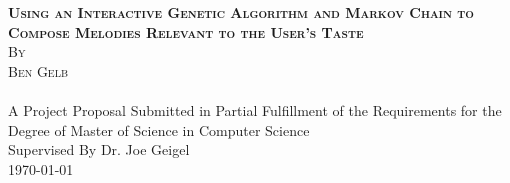\documentclass[12pt]{article} %
\begin{document}

\begin{titlepage}

\newcommand{\HRule}{\rule{\linewidth}{0.5mm}} %

\center %

\textsc{\LARGE \bfseries Using an Interactive Genetic Algorithm and Markov Chain to Compose Melodies Relevant to the User's Taste}\\[1.5cm]
\textsc{\large By}\\[0.5cm] %
\textsc{\large Ben Gelb}\\[0.5cm] %
\textsc{}\\[0.5cm]
{\large A Project Proposal Submitted in Partial Fulﬁllment of the Requirements for the Degree of Master of Science in Computer Science}\\[1.5cm] %
{\large Supervised By Dr. Joe Geigel}\\[1.5cm] %



{\large \today}\\[3cm] %


\vfill %

\end{titlepage}
\end{document}
